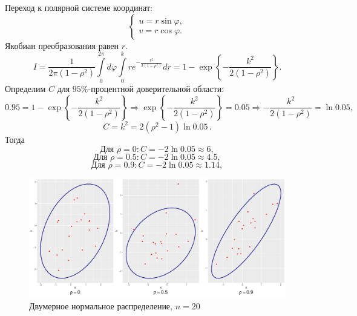 \documentclass[a4paper]{article}
\begin{document}
Переход к полярной системе координат:
\begin{equation*}
    \begin{cases}
    u=r\sin{\varphi},\\
    v=r\cos{\varphi}.
    \end{cases}
\end{equation*}
Якобиан преобразования равен $r$.\\
\begin{equation*}
    I=\dfrac{1}{2\pi(1-\rho^2)}\int\limits_{0}^{2\pi}d\varphi\int\limits_{0}^{k}r e^{-\frac{r^2}{2(1-\rho^2)}}dr=1-\exp\left\{-\dfrac{k^2}{2(1-\rho^2)}\right\}.
\end{equation*}
Определим $C$ для $95\%$-процентной доверительной области:
\begin{equation*}
    0.95=1-\exp\left\{-\dfrac{k^2}{2(1-\rho^2)}\right\}\Longrightarrow \exp\left\{-\dfrac{k^2}{2(1-\rho^2)}\right\}=0.05\Longrightarrow -\dfrac{k^2}{2(1-\rho^2)}=\ln{0.05},
\end{equation*}
\begin{equation*}
    C=k^2=2(\rho^2-1)\ln{0.05}\,.
\end{equation*}
Тогда
\begin{equation*}
    \text{Для }\rho=0:C=-2\ln{0.05}\approx6,
\end{equation*}
\begin{equation*}
    \text{Для }\rho=0.5:C=-2\ln{0.05}\approx4.5,
\end{equation*}
\begin{equation*}
    \text{Для }\rho=0.9:C=-2\ln{0.05}\approx1.14,
\end{equation*}
\begin{figure}[H]
    \centering
    \includegraphics[width = \textwidth, height = 7 cm]{LabSrcs/resources/ellipse20.pdf}
    \caption{Двумерное нормальное распределение, $n=20$}
    \label{fig:el20}
\end{figure}
\end{document}
